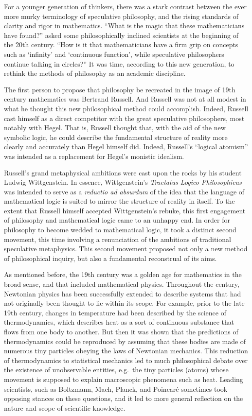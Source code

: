 For a younger generation of thinkers, there was a stark contrast
between the ever more murky terminology of speculative philosophy, and
the rising standards of clarity and rigor in mathematics.  ``What is
the magic that these mathematicians have found?'' asked some
philosophically inclined scientists at the beginning of the 20th
century.  ``How is it that mathematicians have a firm grip on concepts
such as `infinity' and `continuous function', while speculative
philosophers continue talking in circles?''  It was time, according to
this new generation, to rethink the methods of philosophy as an
academic discipline.

The first person to propose that philosophy be recreated in the image
of 19th century mathematics was Bertrand Russell.  And Russell was not
at all modest in what he thought this new philosophical method could
accomplish.  Indeed, Russell cast himself as a direct competitor with
the great speculative philosophers, most notably with Hegel.  That is,
Russell thought that, with the aid of the new symbolic logic, he could
describe the fundamental structure of reality more clearly and
accurately than Hegel himself did.  Indeed, Russell's ``logical
atomism'' was intended as a replacement for Hegel's monistic idealism.

Russell's grand metaphysical ambitions were cast upon the rocks by his
student Ludwig Wittgenstein. In essence, Wittgenstein's
\textit{Tractatus Logico Philosophicus} was intended to serve as a
\textit{reductio ad absurdum} of the idea that the language of
mathematical logic is suited to mirror the structure of reality in
itself.  To the extent that Russell himself accepted Wittgenstein's
rebuke, this first engagement of philosophy and mathematical logic
came to an unhappy end.  In order for philosophy to become wedded to
mathematical logic, it took a distinct second movement, this time
involving a renunciation of the ambitions of traditional speculative
metaphysics.  This second movement proposed not only a new method of
philosophical inquiry, but also a fundamental reconstrual of its aims.

As mentioned before, the 19th century was a golden age for mathematics
in the broad sense, and that included mathematical physics.
Throughout the century, Newtonian physics has been successfully
extended to describe systems that had not originally been thought to
lie within its scope.  For example, prior to the late 19th century,
changes in temperature had been described by the science of
thermodynamics, which describes heat as a sort of continuous substance
that flows from one body to another.  But then it was shown that the
predictions of thermodynamics could be reproduced by assuming that
these bodies are made of numerous tiny particles obeying the laws of
Newtonian mechanics.  This reduction of thermodynamics to statistical
mechanics led to much philosophical debate over the existence of
unobservable entities, e.g.\ the tiny particles (atoms) whose movement
is supposed to explain macroscopic phenomena such as heat.  Leading
scientists, such as Boltzmann, Mach, Planck, and Poincar\'e sometimes
took opposing stances on these questions, and it led to more general
reflection on the nature and scope of scientific knowledge.

